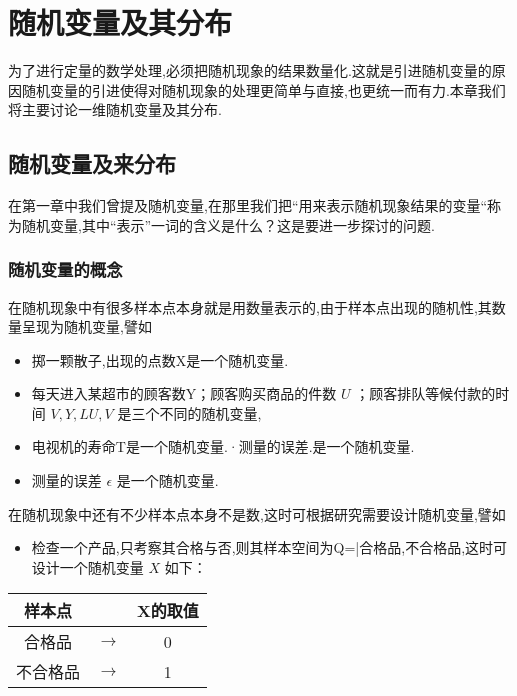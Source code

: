 
\chapter{随机变量及其分布}

为了进行定量的数学处理,必须把随机现象的结果数量化.这就是引进随机变量的原因随机变量的引进使得对随机现象的处理更简单与直接,也更统一而有力.本章我们将主要讨论一维随机变量及其分布.

\section{随机变量及来分布}

在第一章中我们曾提及随机变量,在那里我们把“用来表示随机现象结果的变量“称为随机变量,其中“表示”一词的含义是什么？这是要进一步探讨的问题.

\subsection{随机变量的概念}

在随机现象中有很多样本点本身就是用数量表示的,由于样本点出现的随机性,其数量呈现为随机变量,譬如

\begin{itemize}
	\item 掷一颗散子,出现的点数X是一个随机变量.
	\item 每天进入某超市的顾客数Y；顾客购买商品的件数 $U$ ；顾客排队等候付款的时间 $V,Y,LU,V$ 是三个不同的随机变量,
	\item 电视机的寿命T是一个随机变量.·测量的误差.是一个随机变量.
	\item 测量的误差 $\epsilon $ 是一个随机变量.
\end{itemize}

在随机现象中还有不少样本点本身不是数,这时可根据研究需要设计随机变量,譬如
\begin{itemize}
	\item 检查一个产品,只考察其合格与否,则其样本空间为Q=|合格品,不合格品,这时可设计一个随机变量 $X$ 如下：
\end{itemize}

\begin{table}[htbp]
	\centering
	\begin{tabular}{ccc}
		样本点   &       & X的取值 \\\hline
		合格品   &   $ \longrightarrow $ & 0 \\
		不合格品 &    $ \longrightarrow $ & 1 \\
	\end{tabular}%
\end{table}%

